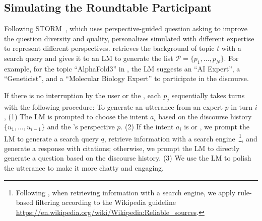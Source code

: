 \subsection{Simulating the Roundtable Participant}
\label{sec:simulate_participant}
Following STORM~\citep{shao2024assisting}, which uses perspective-guided question asking to improve the question diversity and quality, \system personalizes simulated \experts with different expertise to represent different perspectives. \system retrieves the background of topic $t$ with a search query and gives it to an LM to generate the \expert list $\mathcal{P}=\{p_1, ..., p_N\}$. For example, for the topic ``AlphaFold3'' in , the LM suggests an ``AI Expert'', a ``Geneticist'', and a ``Molecular Biology Expert'' to participate in the discourse.  


If there is no interruption by the user or the \moderator, each \expert $p_j$ sequentially takes turns with the following procedure: 
To generate an utterance from an expert $p$ in turn $i$, 
(1) The LM is prompted to choose the intent $a_i$ based on the discourse history $\{u_1, ..., u_{i-1}\}$ and the \expert's perspective $p$. (2) If  the intent $a_i$ is  or , we prompt the LM to generate a search query $q$, retrieve information with a search engine~\footnote{Following \citet{shao2024assisting}, when retrieving information with a search engine, we apply rule-based filtering according to the Wikipedia guideline \url{https://en.wikipedia.org/wiki/Wikipedia:Reliable_sources}.}, and  generate a response with citations; otherwise, we prompt the LM to directly generate a question based on the discourse history.  
(3) We use the LM to polish the utterance to make it more chatty and engaging.%

